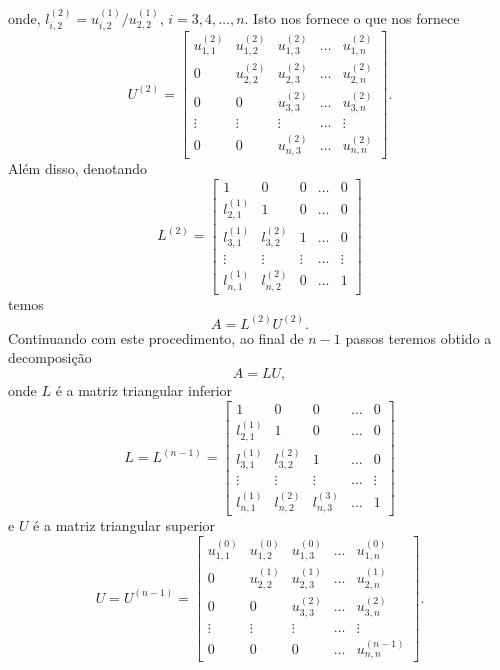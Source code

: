 onde, $l_{i,2}^{(2)} = u_{i,2}^{(1)}/u_{2,2}^{(1)}$, $i=3, 4, \ldots, n$. Isto nos fornece
o que nos fornece
\begin{equation}
  U^{(2)} = \begin{bmatrix}
    u_{1,1}^{(2)} & u_{1,2}^{(2)} & u_{1,3}^{(2)} & \ldots & u_{1,n}^{(2)} \\
    0 & u_{2,2}^{(2)} & u_{2,3}^{(2)} & \ldots & u_{2,n}^{(2)} \\
    0 & 0 & u_{3,3}^{(2)} & \ldots & u_{3,n}^{(2)} \\
    \vdots & \vdots & \vdots & \ldots & \vdots \\
    0 & 0 & u_{n,3}^{(2)} & \ldots & u_{n,n}^{(2)}
  \end{bmatrix}.
\end{equation}
Além disso, denotando
\begin{equation}
  L^{(2)} =
  \begin{bmatrix}
    1 & 0 & 0 & \ldots & 0\\
    l_{2,1}^{(1)} & 1 & 0 & \ldots & 0\\
    l_{3,1}^{(1)} & l_{3,2}^{(2)} & 1 & \ldots & 0\\
    \vdots & \vdots & \vdots & \ldots & \vdots\\
    l_{n,1}^{(1)} & l_{n,2}^{(2)} & 0 & \ldots & 1
  \end{bmatrix}
\end{equation}
temos
\begin{equation}
  A = L^{(2)}U^{(2)}.
\end{equation}
Continuando com este procedimento, ao final de $n-1$ passos teremos obtido a decomposição
\begin{equation}
  A = LU,
\end{equation}
onde $L$ é a matriz triangular inferior
\begin{equation}
  L = L^{(n-1)} =   \begin{bmatrix}
    1 & 0 & 0 & \ldots & 0\\
    l_{2,1}^{(1)} & 1 & 0 & \ldots & 0\\
    l_{3,1}^{(1)} & l_{3,2}^{(2)} & 1 & \ldots & 0\\
    \vdots & \vdots & \vdots & \ldots & \vdots\\
    l_{n,1}^{(1)} & l_{n,2}^{(2)} & l_{n,3}^{(3)} & \ldots & 1
  \end{bmatrix}
\end{equation}
e $U$ é a matriz triangular superior
\begin{equation}
  U = U^{(n-1)} = \begin{bmatrix}
    u_{1,1}^{(0)} & u_{1,2}^{(0)} & u_{1,3}^{(0)} & \ldots & u_{1,n}^{(0)} \\
    0 & u_{2,2}^{(1)} & u_{2,3}^{(1)} & \ldots & u_{2,n}^{(1)} \\
    0 & 0 & u_{3,3}^{(2)} & \ldots & u_{3,n}^{(2)} \\
    \vdots & \vdots & \vdots & \ldots & \vdots \\
    0 & 0 & 0 & \ldots & u_{n,n}^{(n-1)}
  \end{bmatrix}.
\end{equation}

